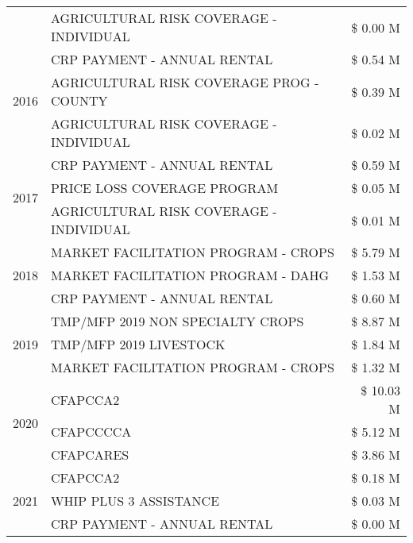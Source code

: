 \begin{tabular}{llr}
 & AGRICULTURAL RISK COVERAGE - INDIVIDUAL & \$ 0.00 M \\
\cline{1-3}
\multirow[t]{3}{*}{2016} & CRP PAYMENT - ANNUAL RENTAL & \$ 0.54 M \\
 & AGRICULTURAL RISK COVERAGE PROG - COUNTY & \$ 0.39 M \\
 & AGRICULTURAL RISK COVERAGE - INDIVIDUAL & \$ 0.02 M \\
\cline{1-3}
\multirow[t]{3}{*}{2017} & CRP PAYMENT - ANNUAL RENTAL & \$ 0.59 M \\
 & PRICE LOSS COVERAGE PROGRAM & \$ 0.05 M \\
 & AGRICULTURAL RISK COVERAGE - INDIVIDUAL & \$ 0.01 M \\
\cline{1-3}
\multirow[t]{3}{*}{2018} & MARKET FACILITATION PROGRAM - CROPS & \$ 5.79 M \\
 & MARKET FACILITATION PROGRAM - DAHG & \$ 1.53 M \\
 & CRP PAYMENT - ANNUAL RENTAL & \$ 0.60 M \\
\cline{1-3}
\multirow[t]{3}{*}{2019} & TMP/MFP 2019 NON SPECIALTY CROPS & \$ 8.87 M \\
 & TMP/MFP 2019 LIVESTOCK & \$ 1.84 M \\
 & MARKET FACILITATION PROGRAM - CROPS & \$ 1.32 M \\
\cline{1-3}
\multirow[t]{3}{*}{2020} & CFAPCCA2 & \$ 10.03 M \\
 & CFAPCCCCA & \$ 5.12 M \\
 & CFAPCARES & \$ 3.86 M \\
\cline{1-3}
\multirow[t]{3}{*}{2021} & CFAPCCA2 & \$ 0.18 M \\
 & WHIP PLUS 3 ASSISTANCE & \$ 0.03 M \\
 & CRP PAYMENT - ANNUAL RENTAL & \$ 0.00 M \\
\cline{1-3}
\bottomrule
\end{tabular}
